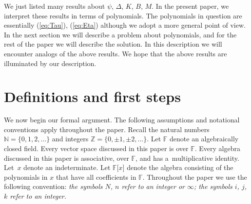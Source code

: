 \documentclass[pdftex]{sigma}
\numberwithin{equation}{section}
\begin{document}
We just listed many results about
$\psi$, $\Delta$, $K$, $B$, $M$. In the present paper, we interpret
these results in terms of polynomials. The polynomials in
question are essentially
(\ref{eq:Tau}),
(\ref{eq:Eta})
although we adopt a more general point of view.
In the next section we will describe a problem about polynomials,
and for the rest of the paper we will describe the solution.
In this description we will encounter
analogs of the above results.
We hope that the above results are illuminated
by our description.

\section{Definitions and first steps}\label{section2}

We now begin our formal argument.
The following assumptions and notational conventions
apply throughout the paper.
Recall the natural numbers $\mathbb N = \lbrace 0,1,2,\ldots\rbrace$
and integers $\mathbb Z = \lbrace 0, \pm 1,\pm 2,\ldots \rbrace$.
Let $\mathbb F$ denote an algebraically closed field.
Every vector space
discussed in this paper is over $\mathbb F$.
Every algebra discussed in this paper is associative,
over $\mathbb F$, and has a~multiplicative identity.
Let~$x$ denote an indeterminate. Let $\mathbb F\lbrack x
\rbrack$ denote the algebra consisting of the polynomials in
$x $ that have all coefficients in $\mathbb F$.
Throughout the paper we use the following convention:
{\it the symbols $N$, $n$ refer to an integer or $\infty$; the
symbols $i$, $j$, $k$ refer to an integer.}
\end{document}

